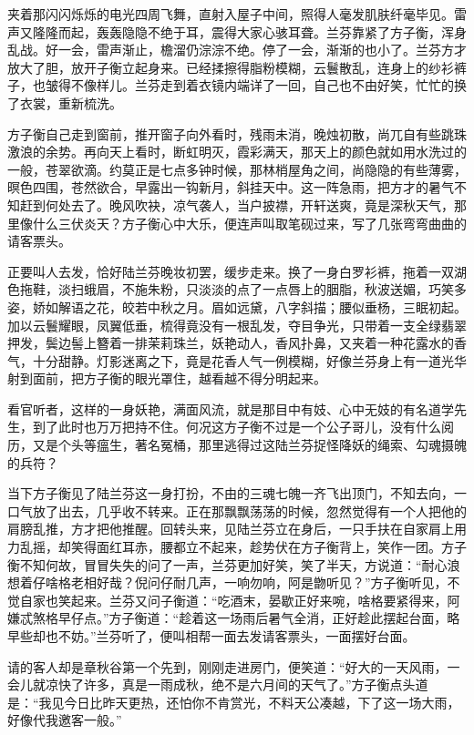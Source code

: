 \documentclass[12pt,UTF8]{ctexbook}
\begin{document}
{{{夹着那闪闪烁烁的电光四周飞舞，直射入屋子中间，照得人毫发肌肤纤毫毕见。雷声又隆隆而起，轰轰隐隐不绝于耳，震得大家心骇耳聋。兰芬靠紧了方子衡，浑身乱战。好一会，雷声渐止，檐溜仍淙淙不绝。停了一会，渐渐的也小了。兰芬方才放大了胆，放开子衡立起身来。已经揉擦得脂粉模糊，云鬟散乱，连身上的纱衫裤子，也皱得不像样儿。兰芬走到着衣镜内端详了一回，自己也不由好笑，忙忙的换了衣裳，重新梳洗。

方子衡自己走到窗前，推开窗子向外看时，残雨未消，晚烛初散，尚兀自有些跳珠激浪的余势。再向天上看时，断虹明灭，霞彩满天，那天上的颜色就如用水洗过的一般，苍翠欲滴。约莫正是七点多钟时候，那林梢屋角之间，尚隐隐的有些薄雾，暝色四围，苍然欲合，早露出一钩新月，斜挂天中。这一阵急雨，把方才的暑气不知赶到何处去了。晚风吹袂，凉气袭人，当户披襟，开轩送爽，竟是深秋天气，那里像什么三伏炎天？方子衡心中大乐，便连声叫取笔砚过来，写了几张弯弯曲曲的请客票头。

正要叫人去发，恰好陆兰芬晚妆初罢，缓步走来。换了一身白罗衫裤，拖着一双湖色拖鞋，淡扫蛾眉，不施朱粉，只淡淡的点了一点唇上的胭脂，秋波送媚，巧笑多姿，娇如解语之花，皎若中秋之月。眉如远黛，八字斜描；腰似垂杨，三眠初起。加以云鬟耀眼，凤翼低垂，梳得竟没有一根乱发，夺目争光，只带着一支全绿翡翠押发，鬓边髻上簪着一排茉莉珠兰，妖艳动人，香风扑鼻，又夹着一种花露水的香气，十分甜静。灯影迷离之下，竟是花香人气一例模糊，好像兰芬身上有一道光华射到面前，把方子衡的眼光罩住，越看越不得分明起来。

看官听者，这样的一身妖艳，满面风流，就是那目中有妓、心中无妓的有名道学先生，到了此时也万万把持不住。何况这方子衡不过是一个公子哥儿，没有什么阅历，又是个头等瘟生，著名冤桶，那里逃得过这陆兰芬捉怪降妖的绳索、勾魂摄魄的兵符？

当下方子衡见了陆兰芬这一身打扮，不由的三魂七魄一齐飞出顶门，不知去向，一口气放了出去，几乎收不转来。正在那飘飘荡荡的时候，忽然觉得有一个人把他的肩膀乱推，方才把他推醒。回转头来，见陆兰芬立在身后，一只手扶在自家肩上用力乱摇，却笑得面红耳赤，腰都立不起来，趁势伏在方子衡背上，笑作一团。方子衡不知何故，冒冒失失的问了一声，兰芬更加好笑，笑了半天，方说道：“耐心浪想着仔啥格老相好哉？倪问仔耐几声，一响勿响，阿是朆听见？”方子衡听见，不觉自家也笑起来。兰芬又问子衡道：“吃酒末，晏歇正好来啘，啥格要紧得来，阿嫌忒煞格早仔点。”方子衡道：“趁着这一场雨后暑气全消，正好趁此摆起台面，略早些却也不妨。”兰芬听了，便叫相帮一面去发请客票头，一面摆好台面。

请的客人却是章秋谷第一个先到，刚刚走进房门，便笑道：“好大的一天风雨，一会儿就凉快了许多，真是一雨成秋，绝不是六月间的天气了。”方子衡点头道是：“我见今日比昨天更热，还怕你不肯赏光，不料天公凑越，下了这一场大雨，好像代我邀客一般。”

}}}
\end{document}
